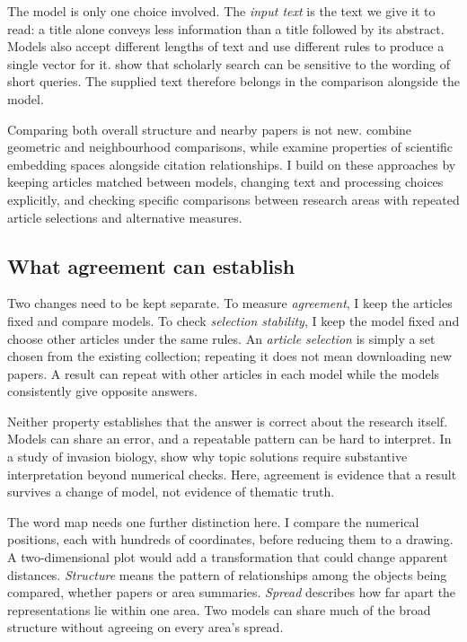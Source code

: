 \documentclass[12pt]{article}
\begin{document}
The model is only one choice involved. The \emph{input text} is the text we give it to read: a title alone conveys less information than a title followed by its abstract. Models also accept different lengths of text and use different rules to produce a single vector for it. \citet{singh-singh-2022-inefficiency} show that scholarly search can be sensitive to the wording of short queries. The supplied text therefore belongs in the comparison alongside the model.

Comparing both overall structure and nearby papers is not new. \citet{ref4e1e0d5582} combine geometric and neighbourhood comparisons, while \citet{ref6da178065c} examine properties of scientific embedding spaces alongside citation relationships. I build on these approaches by keeping articles matched between models, changing text and processing choices explicitly, and checking specific comparisons between research areas with repeated article selections and alternative measures.

\subsection{What agreement can establish}
Two changes need to be kept separate. To measure \emph{agreement}, I keep the articles fixed and compare models. To check \emph{selection stability}, I keep the model fixed and choose other articles under the same rules. An \emph{article selection} is simply a set chosen from the existing collection; repeating it does not mean downloading new papers. A result can repeat with other articles in each model while the models consistently give opposite answers.

Neither property establishes that the answer is correct about the research itself. Models can share an error, and a repeatable pattern can be hard to interpret. In a study of invasion biology, \citet{QSSreviewQ17} show why topic solutions require substantive interpretation beyond numerical checks. Here, agreement is evidence that a result survives a change of model, not evidence of thematic truth.

The word map needs one further distinction here. I compare the numerical positions, each with hundreds of coordinates, before reducing them to a drawing. A two-dimensional plot would add a transformation that could change apparent distances. \emph{Structure} means the pattern of relationships among the objects being compared, whether papers or area summaries. \emph{Spread} describes how far apart the representations lie within one area. Two models can share much of the broad structure without agreeing on every area's spread.
\end{document}
